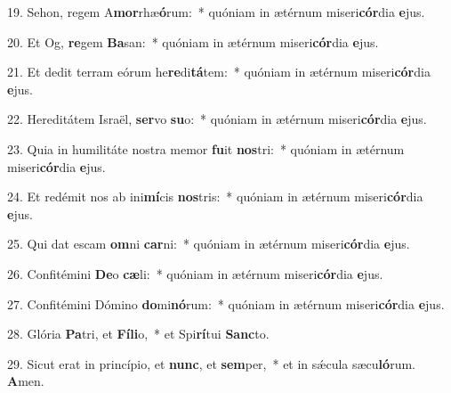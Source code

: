 19. Sehon, regem A\textbf{mor}rhæ\textbf{ó}rum:~*  quóniam in ætérnum miseri\textbf{cór}dia \textbf{e}jus.\

20. Et Og, \textbf{re}gem \textbf{Ba}san:~*  quóniam in ætérnum miseri\textbf{cór}dia \textbf{e}jus.\

21. Et dedit terram eórum he\textbf{re}di\textbf{tá}tem:~*  quóniam in ætérnum miseri\textbf{cór}dia \textbf{e}jus.\

22. Hereditátem Israël, \textbf{ser}vo \textbf{su}o:~*  quóniam in ætérnum miseri\textbf{cór}dia \textbf{e}jus.\

23. Quia in humilitáte nostra memor \textbf{fu}it \textbf{nos}tri:~*  quóniam in ætérnum miseri\textbf{cór}dia \textbf{e}jus.\

24. Et redémit nos ab ini\textbf{mí}cis \textbf{nos}tris:~*  quóniam in ætérnum miseri\textbf{cór}dia \textbf{e}jus.\

25. Qui dat escam \textbf{om}ni \textbf{car}ni:~*  quóniam in ætérnum miseri\textbf{cór}dia \textbf{e}jus.\

26. Confitémini \textbf{De}o \textbf{cæ}li:~*  quóniam in ætérnum miseri\textbf{cór}dia \textbf{e}jus.\

27. Confitémini Dómino \textbf{do}mi\textbf{nó}rum:~*  quóniam in ætérnum miseri\textbf{cór}dia \textbf{e}jus.\

28. Glória \textbf{Pa}tri, et \textbf{Fí}\textbf{li}o,~*  et Spi\textbf{rí}tui \textbf{Sanc}to.\

29. Sicut erat in princípio, et \textbf{nunc}, et \textbf{sem}per,~*  et in sǽcula sæcu\textbf{ló}rum. \textbf{A}men.\

